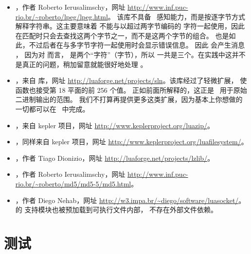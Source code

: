 \begin{itemize}\item {}，作者 Roberto Ierusalimschy，网址
    \url{http://www.inf.puc-rio.br/~roberto/lpeg/lpeg.html}。
    该库不具备 \UNICODE\ 感知能力，而是按逐字节方式解释字符串。这主要意味着
     不能与以超过两字节编码的  字符一起使用，因此
     在匹配时只会去查找这两个字节之一，而不是这两个字节的组合。
     也是如此，不过后者在与多字节字符一起使用时会显示错误信息。
    因此  会产生消息
    ，
    因为对  而言， 是两个“字符”（字节），所以 
    一共是三个。在实践中这并不是真正的问题，稍加留意就能很好地处理 \UNICODE。

\item {}，来自  库，网址
    \url{http://luaforge.net/projects/sln}。该库经过了轻微扩展，
    使  函数也接受第 18 平面的前 256 个值。
    正如前面所解释的，这正是 \LUATEX\ 用于原始二进制输出的范围。
    我们不打算再提供更多这类扩展，因为基本上你想做的一切都可以在 \LUA\ 中完成。

\item {}，来自 kepler 项目，网址
    \url{http://www.keplerproject.org/luazip/}。

\item {}，同样来自 kepler 项目，网址
    \url{http://www.keplerproject.org/luafilesystem/}。

\item {}，作者 Tiago Dionizio，网址
    \url{http://luaforge.net/projects/lzlib/}。

\item {}，作者 Roberto Ierusalimschy，网址
    \url{http://www.inf.puc-rio.br/~roberto/md5/md5-5/md5.html}。

\item {}，作者 Diego Nehab，网址
    \url{http://w3.impa.br/~diego/software/luasocket/}。
     的  支持模块也被预加载到可执行文件内部，
    不存在外部文件依赖。

\end{itemize}

\section{测试}


